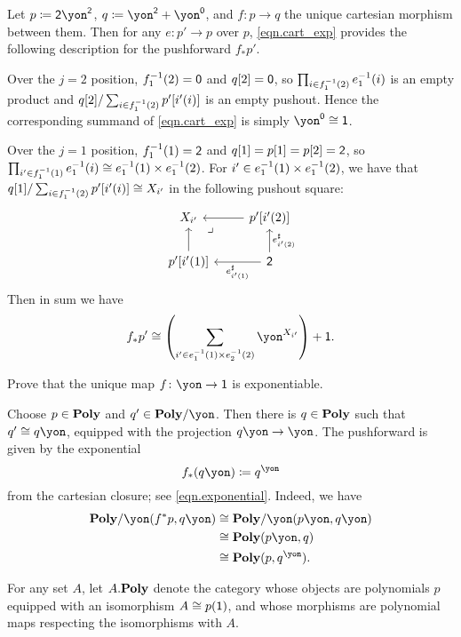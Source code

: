 \documentclass[Book-Poly]{subfiles}
\begin{document}
\begin{example}
Let $p\coloneqq\2\yon^\2$, $q\coloneqq\yon^\2+\yon^\0$, and $f\colon p\to q$ the unique cartesian morphism between them.
Then for any $e\colon p'\to p$ over $p$, \eqref{eqn.cart_exp} provides the following description for the pushforward $f_*p'$.

Over the $j=2$ position, $f_1\inv(2)=\0$ and $q[2]=\0$, so $\prod_{i \in f_1\inv(2)} e_1\inv(i)$ is an empty product and $q[2]/\sum_{i\in f_1\inv(2)} p'[i'(i)]$ is an empty pushout.
Hence the corresponding summand of \eqref{eqn.cart_exp} is simply $\yon^\0\cong\1$.

Over the $j=1$ position, $f_1\inv(1)=\2$ and $q[1]=p[1]=p[2]=\2$, so $\prod_{i'\in f_1\inv(1)} e_1\inv(i) \iso e_1\inv(1)\times e_1\inv(2)$.
For $i' \in e_1\inv(1) \times e_1\inv(2)$, we have that $q[1]/\sum_{i\in f_1\inv(2)} p'[i'(i)] \iso X_{i'}$ in the following pushout square:
\[
\begin{tikzcd}
	X_{i'} \ar[from=r] \ar[from=d] &
	p'[i'(2)] \ar[from=d, "e^\sharp_{i'(2)}"'] \\
	p'[i'(1)] \ar[from=r, "e^\sharp_{i'(1)}"] &
	\2 \ar[ul, phantom, very near end, "\lrcorner"]
\end{tikzcd}
\]
Then in sum we have
\[
    f_*p' \iso \left(\sum_{i' \in e_1\inv(1) \times e_2\inv(2)} \yon^{X_{i'}}\right) + \1.
\]
\end{example}

\begin{exercise}
Prove that the unique map $f\colon\yon\to\1$ is exponentiable.
\begin{solution}
Choose $p\in\poly$ and $q'\in\poly/\yon$. Then there is $q\in\poly$ such that $q'\cong q\yon$, equipped with the projection $q\yon\to\yon$. The pushforward is given by the exponential
\[f_*(q\yon)\coloneqq q^\yon\]
from the cartesian closure; see \eqref{eqn.exponential}. Indeed, we have
\begin{align*}
	\poly/\yon(f^*p,q\yon)&\cong
	\poly/\yon(p\yon,q\yon)\\&\cong
	\poly(p\yon,q)\\&\cong
	\poly(p,q^\yon).
\end{align*}
\end{solution}
\end{exercise}

For any set $A$, let $\poly[A.]$ denote the category whose objects are polynomials $p$ equipped with an isomorphism $A\cong p(\1)$, and whose morphisms are polynomial maps respecting the isomorphisms with $A$.
\end{document}
